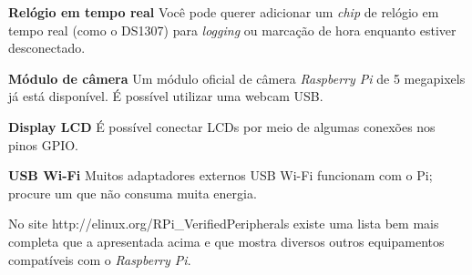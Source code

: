 \textbf{Relógio em tempo real} Você pode querer adicionar um \textit{chip} de relógio em tempo real (como o DS1307) para \textit{logging} ou marcação de hora enquanto estiver desconectado.

\textbf{Módulo de câmera} Um módulo oficial de câmera \textit{Raspberry Pi} de 5 megapixels já está disponível. É possível utilizar uma webcam USB.

\textbf{Display LCD} É possível conectar LCDs por meio de algumas conexões nos pinos GPIO.

\textbf{USB Wi-Fi} Muitos adaptadores externos USB Wi-Fi funcionam com o Pi; procure um que não consuma muita energia.

No site http://elinux.org/RPi\_VerifiedPeripherals existe uma lista bem mais completa que a apresentada acima e que mostra diversos outros equipamentos compatíveis com o \textit{Raspberry Pi}.